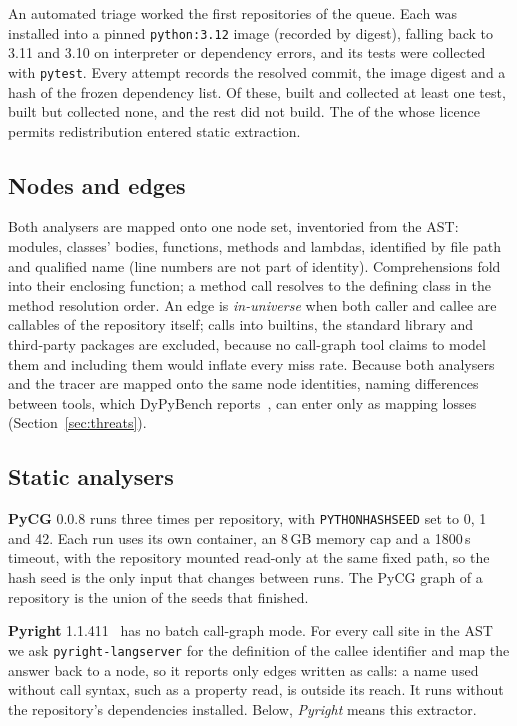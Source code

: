 \documentclass[conference]{IEEEtran}
\begin{document}
An automated triage worked the first \nTriaged{} repositories of the queue. Each was installed
into a pinned \texttt{python:3.12} image (recorded by digest), falling back to 3.11 and 3.10 on
interpreter or dependency errors, and its tests were collected with \texttt{pytest}. Every
attempt records the resolved commit, the image digest and a hash of the frozen dependency list.
Of these, \nAdmissible{} built and collected at least one test, \nCollectEmpty{} built but
collected none, and the rest did not build. The \nStaticAttempted{} of the \nAdmissible{} whose
licence permits redistribution entered static extraction.

\subsection{Nodes and edges}\label{sec:nodes}

Both analysers are mapped onto one node set, inventoried from the AST: modules, classes'
bodies, functions, methods and lambdas, identified by file path and qualified name (line numbers
are not part of identity). Comprehensions fold into their enclosing function; a method call
resolves to the defining class in the method resolution order. An edge is \emph{in-universe}
when both caller and callee are callables of the repository itself; calls into builtins, the
standard library and third-party packages are excluded, because no call-graph tool claims to
model them and including them would inflate every miss rate. Because both analysers and the
tracer are mapped onto the same node identities, naming differences between tools, which
DyPyBench reports~\cite{bouzenia2024dypybench}, can enter only as mapping losses (Section~\ref{sec:threats}).

\subsection{Static analysers}\label{sec:static}

\textbf{PyCG} 0.0.8 runs three times per repository, with \texttt{PYTHONHASHSEED} set to 0, 1
and 42. Each run uses its own container, an 8\,GB memory cap and a 1800\,s timeout, with the
repository mounted read-only at the same fixed path, so the hash seed is the only input that
changes between runs. The PyCG graph of a repository is the union of the seeds that finished.

\textbf{Pyright} 1.1.411~\cite{pyright} has no batch call-graph mode. For every call site in the
AST we ask \texttt{pyright-langserver} for the definition of the callee identifier and map the
answer back to a node, so it reports only edges written as calls: a name used without call syntax,
such as a property read, is outside its reach. It runs without the repository's dependencies
installed. Below, \emph{Pyright} means this extractor.
\end{document}
